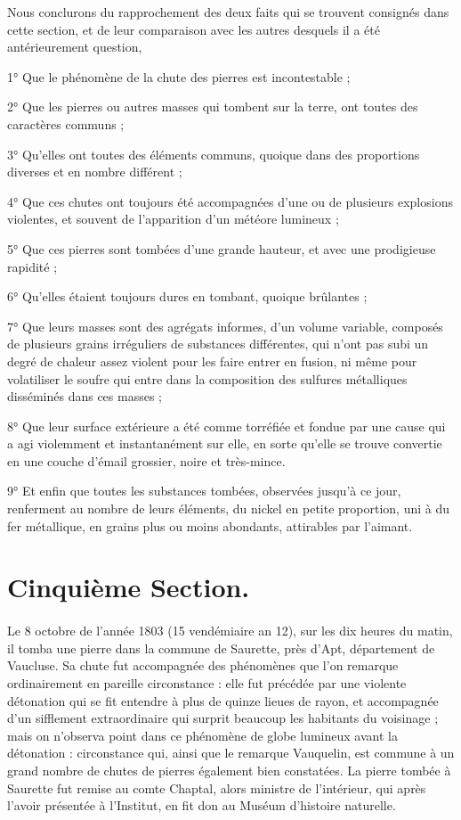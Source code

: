 \documentclass[a4paper, 12pt, oneside, french]{article}
\begin{document}
Nous conclurons du rapprochement des deux faits qui se trouvent consignés dans cette section, et de leur comparaison avec les autres desquels il a été antérieurement question,

1° Que le phénomène de la chute des pierres est incontestable ;

2° Que les pierres ou autres masses qui tombent sur la terre, ont toutes des caractères communs ;

3° Qu'elles ont toutes des éléments communs, quoique dans des proportions diverses et en nombre différent ;

4° Que ces chutes ont toujours été accompagnées d'une ou de plusieurs explosions violentes, et souvent de l'apparition d'un météore lumineux ;

5° Que ces pierres sont tombées d'une grande hauteur, et avec une prodigieuse rapidité ;

6° Qu'elles étaient toujours dures en tombant, quoique brûlantes ;

7° Que leurs masses sont des agrégats informes, d'un volume variable, composés de plusieurs grains irréguliers de substances différentes, qui n'ont pas subi un degré de chaleur assez violent pour les faire entrer en fusion, ni même pour volatiliser le soufre qui entre dans la composition des sulfures métalliques disséminés dans ces masses ;

8° Que leur surface extérieure a été comme torréfiée et fondue par une cause qui a agi violemment et instantanément sur elle, en sorte qu'elle se trouve convertie en une couche d'émail grossier, noire et très-mince.

9° Et enfin que toutes les substances tombées, observées jusqu'à ce jour, renferment au nombre de leurs éléments, du nickel en petite proportion, uni à du fer métallique, en grains plus ou moins abondants, attirables par l'aimant.
\clearpage
\section{Cinquième Section.}
\paragraph{}
Le 8 octobre de l'année 1803 (15 vendémiaire an 12), sur les dix heures du matin, il tomba une pierre dans la commune de Saurette, près d'Apt, département de Vaucluse. Sa chute fut accompagnée des phénomènes que l'on remarque ordinairement en pareille circonstance : elle fut précédée par une violente détonation qui se fit entendre à plus de quinze lieues de rayon, et accompagnée d'un sifflement extraordinaire qui surprit beaucoup les habitants du voisinage ; mais on n'observa point dans ce phénomène de globe lumineux avant la détonation : circonstance qui, ainsi que le remarque Vauquelin, est commune à un grand nombre de chutes de pierres également bien constatées. La pierre tombée à Saurette fut remise au comte Chaptal, alors ministre de l'intérieur, qui après l'avoir présentée à l'Institut, en fit don au Muséum d'histoire naturelle.
\end{document}
